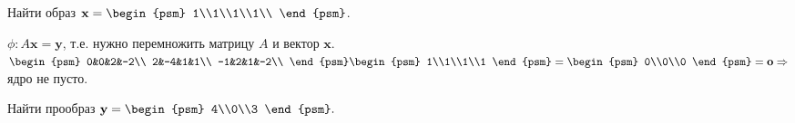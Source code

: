 \begin{prim}
	Найти образ $\textbf{x}=\begin{psm}
	1\\1\\1\\1\\
	\end{psm}$.
\end{prim}
$\phi: A\textbf{x}=\textbf{y}$, т.е. нужно перемножить матрицу $A$ и вектор $\textbf{x}$.\\
$
\begin{psm}
0&0&2&-2\\
2&-4&1&1\\
-1&2&1&-2\\
\end{psm}
\begin{psm}
1\\1\\1\\1
\end{psm}
=
\begin{psm}
0\\0\\0
\end{psm}
=\textbf{o}
\Rightarrow$ ядро не пусто.
\begin{prim}
	Найти прообраз $\textbf{y}=\begin{psm}
	4\\0\\3
	\end{psm}.$
\end{prim}\\

